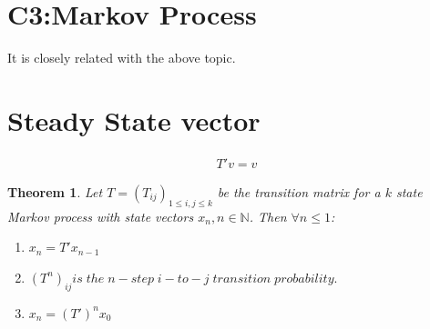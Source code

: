 \documentclass{article}
\newtheorem{thm}{Theorem}
\begin{document}
\begin{spacing}{1.5}
\section{C3:Markov Process}
It is closely related with the above topic. 
\section{Steady State vector}
\begin{align}
    T'v=v
\end{align}

\begin{thm}
Let $T = (T_{ij})_{1 \le i,j \le k}$ be the transition matrix for a $k$ state Markov process with state vectors $x_n,n \in \mathbb{N} $. Then $\forall n \le 1$:
\begin{enumerate}
    \item $x_n = T'x_{n-1}$
    \item $(T^n)_{ij} is  \;the \;n-step \;i-to-j \; transition\; probability.$
    \item $x_n = (T')^n x_0$
\end{enumerate}
\end{thm}

\end{spacing}
\end{document}

